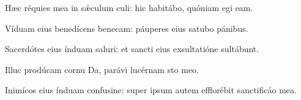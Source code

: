 \item Hæc réquies mea in sǽculum culi:\psstar{} hic habitábo, quóniam egi eam.

\item Víduam eius benedícens benecam:\psstar{} páuperes eius satubo pánibus.

\item Sacerdótes eius índuam saluri:\psstar{} et sancti eius exsultatióne sultábunt.

\item Illuc prodúcam cornu Da,\psstar{} parávi lucérnam sto meo.

\item Inimícos eius índuam confusine:\psstar{} super ipsum autem efflorébit sanctificáo mea.
